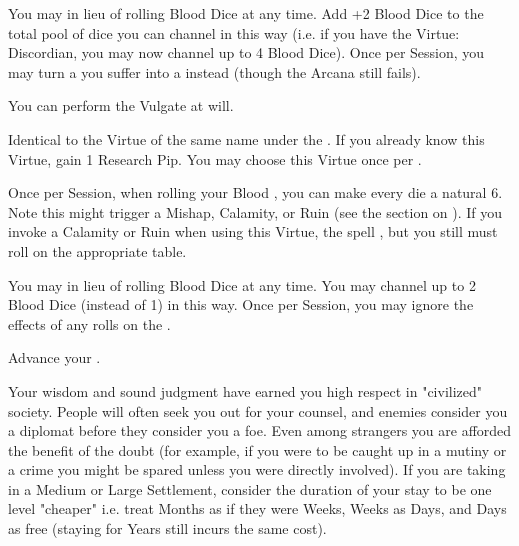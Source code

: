 \begin{multicols*}{2}



You may  in lieu of rolling Blood Dice at any time. Add +2 Blood Dice to the total pool of dice you can channel in this way (i.e. if you have the Virtue: Discordian, you may now channel up to 4 Blood Dice). Once per Session, you may turn a  you suffer into a  instead (though the Arcana still fails).


You can perform the  Vulgate at will.


Identical to the Virtue of the same name under the . If you already know this Virtue, gain 1 Research Pip. You may choose this Virtue once per \LVL.


\newpage


Once per Session, when rolling your Blood \POOL, you can make every die a natural 6.  Note this might trigger a Mishap, Calamity, or Ruin (see the section on ).  If you invoke a Calamity or Ruin when using this Virtue, the spell , but you still must roll on the appropriate table.


   You may  in lieu of rolling Blood Dice at any time. You may channel up to 2 Blood Dice (instead of 1) in this way. Once per Session, you may ignore the effects of any rolls on the .



Advance your  \DCUP. 


Your wisdom and sound judgment have earned you high respect in "civilized" society. People will often seek you out for your counsel, and enemies consider you a diplomat before they consider you a foe. Even among strangers you are afforded the benefit of the doubt (for example, if you were to be caught up in a mutiny or a crime you might be spared unless you were directly involved). If you are taking  in a Medium or Large Settlement, consider the duration of your stay to be one level "cheaper" i.e. treat Months as if they were Weeks, Weeks as Days, and Days as free (staying for Years still incurs the same cost).


\end{multicols*}
